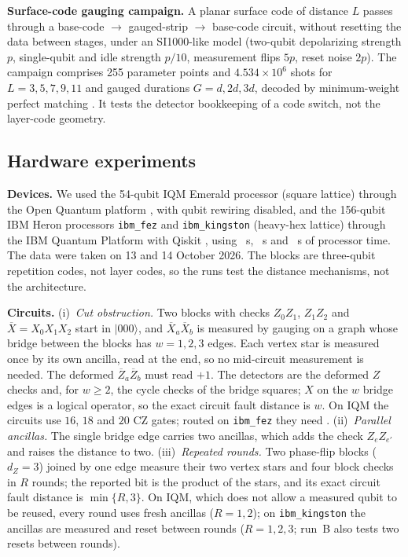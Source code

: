 \documentclass[10pt,a4paper,twocolumn]{article}
\begin{document}
\textbf{Surface-code gauging campaign.}  A planar surface code of distance $L$
passes through a base-code $\to$ gauged-strip $\to$ base-code circuit, without
resetting the data between stages, under an SI1000-like model (two-qubit
depolarizing strength $p$, single-qubit and idle strength $p/10$, measurement
flips $5p$, reset noise $2p$).  The campaign comprises 255 parameter points and
$4.534\times10^6$ shots for $L=3,5,7,9,11$ and gauged durations $G=d,2d,3d$,
decoded by minimum-weight perfect matching \cite{PyMatching}.  It tests the
detector bookkeeping of a code switch, not the layer-code geometry.

\subsection{Hardware experiments}
\label{sec:hw-methods}
\textbf{Devices.}  We used the 54-qubit IQM Emerald processor (square lattice)
through the Open Quantum platform \cite{OpenQuantum2026}, with qubit rewiring
disabled, and the 156-qubit IBM Heron processors \texttt{ibm\_fez} and
\texttt{ibm\_kingston} (heavy-hex lattice) through the IBM Quantum Platform with
Qiskit \cite{Qiskit}, using \hwQpuFez~s, \hwQpuA~s and \hwQpuB~s of processor
time.  The data were taken on 13 and 14 October 2026.  The blocks are three-qubit
repetition codes, not layer codes, so the runs test the distance mechanisms,
not the architecture.

\textbf{Circuits.}  (i)~\emph{Cut obstruction.}  Two blocks with checks
$Z_0Z_1$, $Z_1Z_2$ and $\overline X=X_0X_1X_2$ start in $|000\rangle$, and
$\overline X_a\overline X_b$ is measured by gauging on a graph whose bridge
between the blocks has $w=1,2,3$ edges.  Each vertex star is measured once by
its own ancilla, read at the end, so no mid-circuit measurement is needed.  The
deformed $\overline Z_a\overline Z_b$ must read $+1$.  The detectors are the
deformed $Z$ checks and, for $w\ge2$, the cycle checks of the bridge squares;
$X$ on the $w$ bridge edges is a logical operator, so the exact circuit fault
distance is $w$.  On IQM the circuits use $16$, $18$ and $20$ CZ gates; routed
on \texttt{ibm\_fez} they need \hwFezCZ.  (ii)~\emph{Parallel ancillas.}  The
single bridge edge carries two ancillas, which adds the check $Z_eZ_{e'}$ and
raises the distance to two.  (iii)~\emph{Repeated rounds.}  Two phase-flip
blocks ($d_Z=3$) joined by one edge measure their two vertex stars and four block
checks in $R$ rounds; the reported bit is the product of the stars, and its
exact circuit fault distance is $\min\{R,3\}$.  On IQM, which does not allow a
measured qubit to be reused, every round uses fresh ancillas ($R=1,2$); on
\texttt{ibm\_kingston} the ancillas are measured and reset between rounds
($R=1,2,3$; run~B also tests two resets between rounds).
\end{document}
